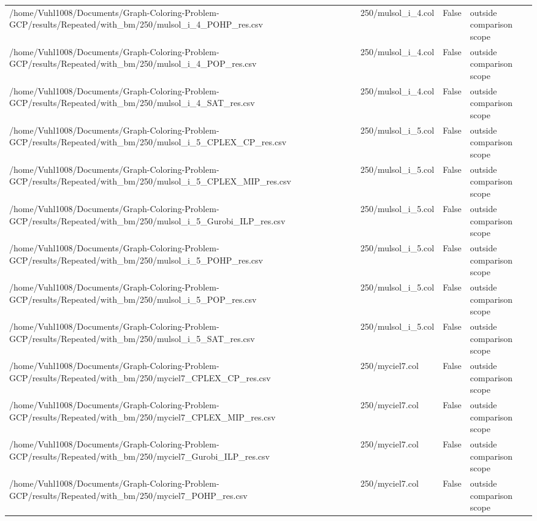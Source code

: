 \begin{table}[htbp]
\begin{tabular}{llll}
/home/Vuhl1008/Documents/Graph-Coloring-Problem-GCP/results/Repeated/with\_bm/250/mulsol\_i\_4\_POHP\_res.csv & 250/mulsol\_i\_4.col & False & outside comparison scope \\
/home/Vuhl1008/Documents/Graph-Coloring-Problem-GCP/results/Repeated/with\_bm/250/mulsol\_i\_4\_POP\_res.csv & 250/mulsol\_i\_4.col & False & outside comparison scope \\
/home/Vuhl1008/Documents/Graph-Coloring-Problem-GCP/results/Repeated/with\_bm/250/mulsol\_i\_4\_SAT\_res.csv & 250/mulsol\_i\_4.col & False & outside comparison scope \\
/home/Vuhl1008/Documents/Graph-Coloring-Problem-GCP/results/Repeated/with\_bm/250/mulsol\_i\_5\_CPLEX\_CP\_res.csv & 250/mulsol\_i\_5.col & False & outside comparison scope \\
/home/Vuhl1008/Documents/Graph-Coloring-Problem-GCP/results/Repeated/with\_bm/250/mulsol\_i\_5\_CPLEX\_MIP\_res.csv & 250/mulsol\_i\_5.col & False & outside comparison scope \\
/home/Vuhl1008/Documents/Graph-Coloring-Problem-GCP/results/Repeated/with\_bm/250/mulsol\_i\_5\_Gurobi\_ILP\_res.csv & 250/mulsol\_i\_5.col & False & outside comparison scope \\
/home/Vuhl1008/Documents/Graph-Coloring-Problem-GCP/results/Repeated/with\_bm/250/mulsol\_i\_5\_POHP\_res.csv & 250/mulsol\_i\_5.col & False & outside comparison scope \\
/home/Vuhl1008/Documents/Graph-Coloring-Problem-GCP/results/Repeated/with\_bm/250/mulsol\_i\_5\_POP\_res.csv & 250/mulsol\_i\_5.col & False & outside comparison scope \\
/home/Vuhl1008/Documents/Graph-Coloring-Problem-GCP/results/Repeated/with\_bm/250/mulsol\_i\_5\_SAT\_res.csv & 250/mulsol\_i\_5.col & False & outside comparison scope \\
/home/Vuhl1008/Documents/Graph-Coloring-Problem-GCP/results/Repeated/with\_bm/250/myciel7\_CPLEX\_CP\_res.csv & 250/myciel7.col & False & outside comparison scope \\
/home/Vuhl1008/Documents/Graph-Coloring-Problem-GCP/results/Repeated/with\_bm/250/myciel7\_CPLEX\_MIP\_res.csv & 250/myciel7.col & False & outside comparison scope \\
/home/Vuhl1008/Documents/Graph-Coloring-Problem-GCP/results/Repeated/with\_bm/250/myciel7\_Gurobi\_ILP\_res.csv & 250/myciel7.col & False & outside comparison scope \\
/home/Vuhl1008/Documents/Graph-Coloring-Problem-GCP/results/Repeated/with\_bm/250/myciel7\_POHP\_res.csv & 250/myciel7.col & False & outside comparison scope \\

\end{tabular}
\end{table}
